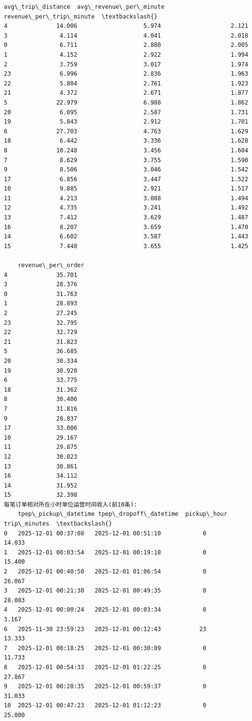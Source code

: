 \documentclass[11pt]{article}
\begin{document}
\begin{Verbatim}[commandchars=\\\{\}]
    avg\_trip\_distance  avg\_revenue\_per\_minute  revenue\_per\_trip\_minute  \textbackslash{}
4              14.006                   5.974                    2.121
3               4.114                   4.041                    2.018
0               6.711                   2.880                    2.005
1               4.152                   2.922                    1.994
2               3.759                   3.017                    1.974
23              6.996                   2.836                    1.963
22              5.804                   2.761                    1.923
21              4.372                   2.671                    1.877
5              22.979                   6.988                    1.862
20              6.095                   2.587                    1.731
19              5.843                   2.912                    1.701
6              27.703                   4.763                    1.629
18              6.442                   3.336                    1.628
8              10.248                   3.456                    1.604
7               8.629                   3.755                    1.590
9               8.506                   3.046                    1.542
17              6.856                   3.447                    1.522
10              9.885                   2.921                    1.517
11              4.213                   3.088                    1.494
12              4.735                   3.241                    1.492
13              7.412                   3.629                    1.487
16              8.207                   3.659                    1.470
14              6.602                   3.587                    1.443
15              7.448                   3.655                    1.425

    revenue\_per\_order
4              35.701
3              28.376
0              31.763
1              28.893
2              27.245
23             32.795
22             32.729
21             31.823
5              36.685
20             30.334
19             30.920
6              33.775
18             31.362
8              30.406
7              31.816
9              28.837
17             33.006
10             29.167
11             29.875
12             30.023
13             30.861
16             34.112
14             31.952
15             32.398
每笔订单相对所在小时单位运营时间收入(前10条):
    tpep\_pickup\_datetime tpep\_dropoff\_datetime  pickup\_hour  trip\_minutes  \textbackslash{}
0   2025-12-01 00:37:08   2025-12-01 00:51:10            0        14.033
1   2025-12-01 00:03:54   2025-12-01 00:19:18            0        15.400
2   2025-12-01 00:40:50   2025-12-01 01:06:54            0        26.067
3   2025-12-01 00:21:30   2025-12-01 00:49:35            0        28.083
4   2025-12-01 00:00:24   2025-12-01 00:03:34            0         3.167
6   2025-11-30 23:59:23   2025-12-01 00:12:43           23        13.333
7   2025-12-01 00:18:25   2025-12-01 00:30:09            0        11.733
8   2025-12-01 00:54:33   2025-12-01 01:22:25            0        27.867
9   2025-12-01 00:28:35   2025-12-01 00:59:37            0        31.033
10  2025-12-01 00:47:23   2025-12-01 01:12:23            0        25.000


\end{Verbatim}
\end{document}

